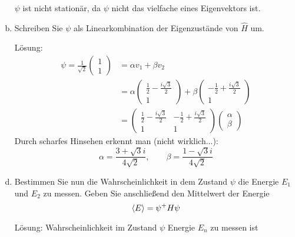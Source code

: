 \documentclass{scrartcl}
\newcommand{\vecz}[2]{\begin{pmatrix}#1 \\ #2\end{pmatrix}}
\begin{document}
\begin{enumerate}[a)]
$\psi$ ist nicht stationär, da $\psi$ nicht das vielfache eines Eigenvektors ist.
\item Schreiben Sie $\psi$ als Linearkombination der Eigenzustände von $\hat H$ um.
\item[Lösung:]
\begin{align*}
\psi = \frac 1{\sqrt 2} \vecz 11 &= \alpha v_1 + \beta v_2 \\
	&= \alpha \vecz{\frac 12 -\frac{i\sqrt 3}2}1 + \beta \vecz{-\frac 12 +\frac{i\sqrt 3}2}1 \\
	&= \begin{pmatrix} 
	\frac 12 -\frac{i\sqrt 3}2 & -\frac 12 +\frac{i\sqrt 3}2 \\
	1 & 1 	\end{pmatrix} \vecz \alpha \beta
\end{align*}
Durch scharfes Hinsehen erkennt man (nicht wirklich...):
\[\alpha = \frac{3+\sqrt{3} i}{4 \sqrt{2}}, \qquad 
   \beta = \frac{1-\sqrt{3} i}{4 \sqrt{2}} \]

\item Bestimmen Sie nun die Wahrscheinlichkeit in dem Zustand $\psi$ die Energie $E_1$ und $E_2$ zu messen. Geben Sie anschließend den Mittelwert der Energie
\[\braket{E} = \psi^+ H \psi\]

\item[Lösung:]
Wahrscheinlichkeit im Zustand $\psi$ Energie $E_n$ zu messen ist 





\end{enumerate}
\end{document}

